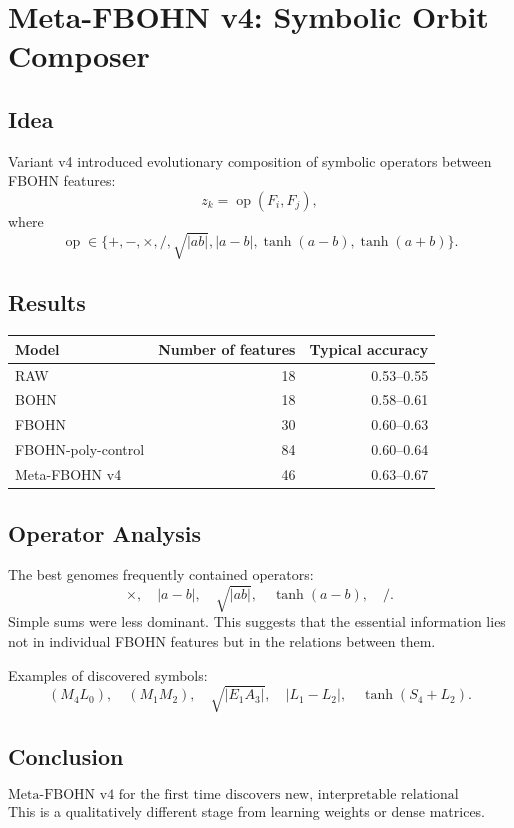 \section{Meta-FBOHN v4: Symbolic Orbit Composer}
\label{sec:meta_fbohn_v4}

\subsection{Idea}
Variant v4 introduced evolutionary composition of symbolic operators between FBOHN features:
\[
z_k=\operatorname{op}(F_i,F_j),
\]
where
\[
\operatorname{op}\in\{+,-,\times,/,\sqrt{|ab|},|a-b|,\tanh(a-b),\tanh(a+b)\}.
\]

\subsection{Results}
\begin{center}
\begin{tabular}{lrr}
\toprule
Model & Number of features & Typical accuracy\\
\midrule
RAW & 18 & 0.53--0.55\\
BOHN & 18 & 0.58--0.61\\
FBOHN & 30 & 0.60--0.63\\
FBOHN-poly-control & 84 & 0.60--0.64\\
Meta-FBOHN v4 & 46 & 0.63--0.67\\
\bottomrule
\end{tabular}
\end{center}

\subsection{Operator Analysis}
The best genomes frequently contained operators:
\[
\times,\quad |a-b|,\quad \sqrt{|ab|},\quad \tanh(a-b),\quad /.
\]
Simple sums were less dominant. This suggests that the essential information lies not in individual FBOHN features but in the relations between them.

Examples of discovered symbols:
\[
(M_4L_0),\quad (M_1M_2),\quad \sqrt{|E_1A_3|},\quad |L_1-L_2|,
\quad \tanh(S_4+L_2).
\]

\subsection{Conclusion}
\[
\boxed{\text{Meta-FBOHN v4 for the first time discovers new, interpretable relational operators.}}
\]
This is a qualitatively different stage from learning weights or dense matrices.
